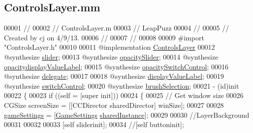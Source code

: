\hypertarget{_controls_layer_8mm}{\subsection{Controls\-Layer.\-mm}
\label{db/d91/_controls_layer_8mm}
}

\begin{DoxyCode}
00001 \textcolor{comment}{//}
00002 \textcolor{comment}{//  ControlsLayer.m}
00003 \textcolor{comment}{//  LeapPuzz}
00004 \textcolor{comment}{//}
00005 \textcolor{comment}{//  Created by cj on 4/9/13.}
00006 \textcolor{comment}{//}
00007 \textcolor{comment}{//}
00008 
00009 \textcolor{preprocessor}{#import "ControlsLayer.h"}
00010 
00011 \textcolor{keyword}{@implementation }\hyperlink{interface_controls_layer}{ControlsLayer}
00012 \textcolor{keyword}{@synthesize} \hyperlink{interface_controls_layer_a599701380c37caf4e656efaa860469a3}{slider};
00013 \textcolor{keyword}{@synthesize} \hyperlink{interface_controls_layer_aff48213936f8ff3b2aa2f44d5125fc6f}{opacitySlider};
00014 \textcolor{keyword}{@synthesize} \hyperlink{interface_controls_layer_a1a60fd6edd83a2789b575845390a44be}{opacitydisplayValueLabel};
00015 \textcolor{keyword}{@synthesize} \hyperlink{interface_controls_layer_ad2bbac273b79a99c46e66c61ea66c88b}{opacitySwitchControl};
00016 \textcolor{keyword}{@synthesize} \hyperlink{interface_controls_layer_aebfe5471226d1bc0afef5d662219f913}{delegate};
00017 
00018 \textcolor{keyword}{@synthesize} \hyperlink{interface_controls_layer_ab9f12f7a90a0bf6ae1abaeb4d4c4e378}{displayValueLabel};
00019 \textcolor{keyword}{@synthesize} \hyperlink{interface_controls_layer_a8997cfae8a4f6bcfb8c53d8cab6bb480}{switchControl};
00020 \textcolor{keyword}{@synthesize} \hyperlink{interface_controls_layer_a56c514c5fde8025a9de19c4b8225478b}{brushSelection};
00021 - (id)init
00022 \{
00023     \textcolor{keywordflow}{if} ((\textcolor{keyword}{self} = [super init]))
00024     \{
00025         \textcolor{comment}{// Get window size}
00026         CGSize screenSize = [[CCDirector sharedDirector] winSize];
00027         
00028         \hyperlink{interface_controls_layer_a6fb04c60ed1bfab11e2940a025b4927e}{gameSettings} = [\hyperlink{interface_game_settings}{GameSettings} \hyperlink{interface_game_settings_abdcc2e77ea14381a85c6de67c83df624}{sharedInstance}];
00029         
00030         \textcolor{comment}{//LayerBackground}
00031         
00032         
00033         [\textcolor{keyword}{self} sliderinit];
00034         \textcolor{comment}{//[self buttoninit];}

\end{DoxyCode}
